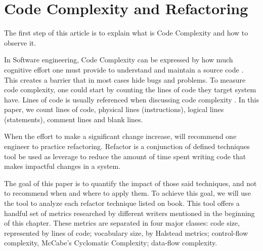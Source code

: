 \section{Code Complexity and Refactoring}

The first step of this article is to explain what is Code Complexity and how to observe it.

In Software engineering, Code Complexity can be expressed by how much cognitive effort one must provide to understand
and maintain a source code \cite{article:fmricc}. This creates a barrier that in most cases hide bugs and problems.
To measure code complexity, one could start by counting the lines of code they target system have. Lines of code is usually
referenced when discussing code complexity \cite{article:rustcc}. In this paper, we count lines of code, physical lines (instructions),
logical lines (statements), comment lines and blank lines.


When the effort to make a significant change increase, \cite{book:refactoring} will recommend one engineer to practice
refactoring. Refactor is a conjunction of defined techniques tool be used as leverage to reduce the amount of time spent
writing code that makes impactful changes in a system.

The goal of this paper is to quantify the impact of those said techniques, and not to recommend when and where to apply them.
To achieve this goal, we will use the \cite{article:mozilla} tool to analyze each refactor technique listed on
\cite{book:refactoring} book. This tool offers a handful set of metrics researched by
different writers mentioned in the beginning of this chapter. These metrics are separated in four major classes: code size,
represented by lines of code; vocabulary size, by Halstead metrics; control-flow complexity, McCabe's Cyclomatic
Complexity; data-flow complexity.

